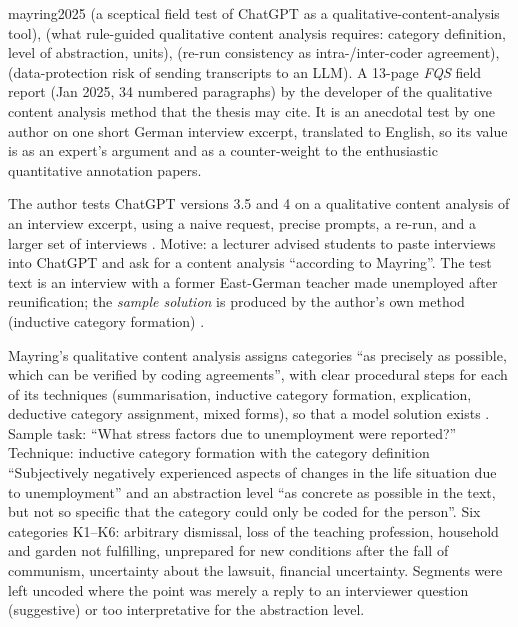 \begin{papercard}{mayring2025}
  (a sceptical field test of ChatGPT as a qualitative-content-analysis tool),  (what rule-guided qualitative content analysis requires: category definition, level of abstraction, units),  (re-run consistency as intra-/inter-coder agreement),  (data-protection risk of sending transcripts to an LLM). A 13-page \emph{FQS} field report (Jan 2025, 34 numbered paragraphs) by the developer of the qualitative content analysis method that the thesis may cite. It is an anecdotal test by one author on one short German interview excerpt, translated to English, so its value is as an expert's argument and as a counter-weight to the enthusiastic quantitative annotation papers.

 The author tests ChatGPT versions 3.5 and 4 on a qualitative content analysis of an interview excerpt, using a naive request, precise prompts, a re-run, and a larger set of interviews . Motive: a lecturer advised students to paste interviews into ChatGPT and ask for a content analysis ``according to Mayring''. The test text is an interview with a former East-German teacher made unemployed after reunification; the \emph{sample solution} is produced by the author's own method (inductive category formation) .

 Mayring's qualitative content analysis assigns categories ``as precisely as possible, which can be verified by coding agreements'', with clear procedural steps for each of its techniques (summarisation, inductive category formation, explication, deductive category assignment, mixed forms), so that a model solution exists . Sample task: ``What stress factors due to unemployment were reported?'' Technique: inductive category formation with the category definition ``Subjectively negatively experienced aspects of changes in the life situation due to unemployment''  and an abstraction level ``as concrete as possible in the text, but not so specific that the category could only be coded for the person''. Six categories K1--K6: arbitrary dismissal, loss of the teaching profession, household and garden not fulfilling, unprepared for new conditions after the fall of communism, uncertainty about the lawsuit, financial uncertainty. Segments were left uncoded where the point was merely a reply to an interviewer question (suggestive) or too interpretative for the abstraction level.


\end{papercard}
